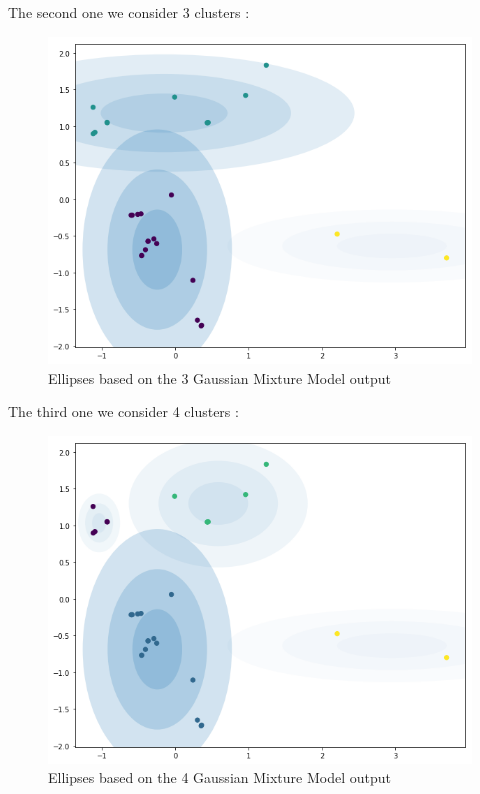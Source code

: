 \documentclass[12pt,twoside]{article}
\begin{document}
The second one we consider 3 clusters :
\begin{center}
	\begin{figure}
		\includegraphics[scale=0.7]{3.png}
		\caption{Ellipses based on the 3 Gaussian Mixture Model output}	     
	\end{figure}
\end{center}

The third one we consider 4 clusters :
\begin{center}
	\begin{figure}
		\includegraphics[scale=0.7]{5.png}
		\caption{Ellipses based on the 4 Gaussian Mixture Model output}	     
	\end{figure}
\end{center}
\end{document}
